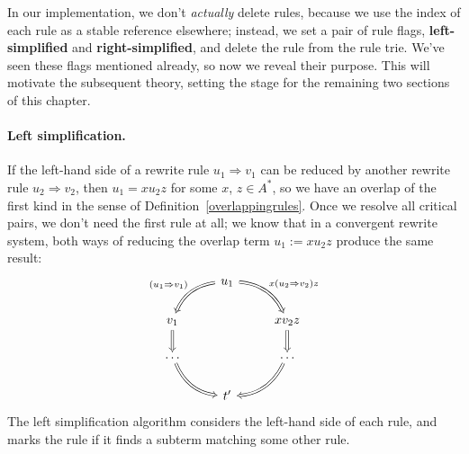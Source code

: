 \documentclass[../generics]{subfiles}
\begin{document}
In our implementation, we don't \emph{actually} delete rules, because we use the index of each rule as a stable reference elsewhere; instead, we set a pair of rule flags, \textbf{left-simplified} and \textbf{right-simplified}, and delete the rule from the rule trie. We've seen these flags mentioned already, so now we reveal their purpose. This will motivate the subsequent theory, setting the stage for the remaining two sections of this chapter.

\paragraph{Left simplification.} If the left-hand side of a rewrite rule $u_1\Rightarrow v_1$ can be reduced by another rewrite rule $u_2\Rightarrow v_2$, then $u_1=xu_2z$ for some $x$, $z\in A^*$, so we have an overlap of the first kind in the sense of Definition~\ref{overlappingrules}. Once we resolve all critical pairs, we don't need the first rule at all; we know that in a convergent rewrite system, both ways of reducing the overlap term $u_1:=xu_2z$ produce the same result:
\[
\begin{tikzcd}
&u_1
\arrow[ld, Rightarrow, bend right, "(u_1\Rightarrow v_1)"']
\arrow[rd, Rightarrow, bend left, "x(u_2\Rightarrow v_2)z"]
\\
v_1\arrow[d, Rightarrow]&&xv_2z\arrow[d, Rightarrow]\\
\ldots\arrow[rd, Rightarrow, bend right]&&\ldots\arrow[ld, Rightarrow, bend left]\\
&t^\prime&
\end{tikzcd}
\]
The left simplification algorithm considers the left-hand side of each rule, and marks the rule if it finds a subterm matching some other rule.
\end{document}
